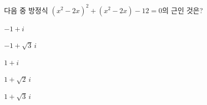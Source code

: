 다음 중 방정식 $(x^2-2x)^2+(x^2-2x)-12=0$의 근인 것은?
\begin{choices32}{\rule[-3ex]{0pt}{8ex}$-1+i$}{\rule[-3ex]{0pt}{8ex}$-1+\sqrt{3}\,i$}{\rule[-3ex]{0pt}{8ex}$1+i$}{\rule[-3ex]{0pt}{8ex}$1+\sqrt{2}\,i$}{\rule[-3ex]{0pt}{8ex}$1+\sqrt{3}\,i$}\end{choices32}
